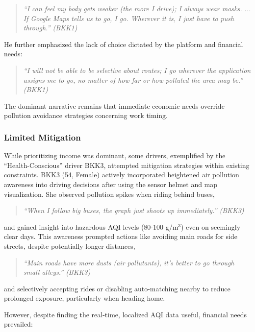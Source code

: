 \begin{quote}
  \em
    ``I can feel my body gets weaker (the more I drive); I always wear masks. ... If Google Maps tells us to go, I go. Wherever it is, I just have to push through.'' (BKK1)
\end{quote}

He further emphasized the lack of choice dictated by the platform and financial needs:

\begin{quote}
  \em
    ``I will not be able to be selective about routes; I go wherever the application assigns me to go, no matter of how far or how polluted the area may be.'' (BKK1)
\end{quote}



The dominant narrative remains that immediate economic needs override pollution avoidance strategies concerning work timing.

\subsubsection{Limited Mitigation}
While prioritizing income was dominant, some drivers, exemplified by the ``Health-Conscious'' driver BKK3, attempted mitigation strategies within existing constraints.
BKK3 (54, Female) actively incorporated heightened air pollution awareness into driving decisions after using the sensor helmet and map visualization.
She observed pollution spikes when riding behind buses,

\begin{quote}
  \em
    ``When I follow big buses, the graph just shoots up immediately.'' (BKK3)
\end{quote}

and gained insight into hazardous AQI levels (80-100 \textmu{}g/m$^3$) even on seemingly clear days. This awareness prompted actions like avoiding main roads for side streets, despite potentially longer distances,

\begin{quote}
  \em
    ``Main roads have more dusts (air pollutants), it’s better to go through small alleys.'' (BKK3)
\end{quote}

and selectively accepting rides or disabling auto-matching nearby to reduce prolonged exposure, particularly when heading home.


However, despite finding the real-time, localized AQI data useful, financial needs prevailed:

